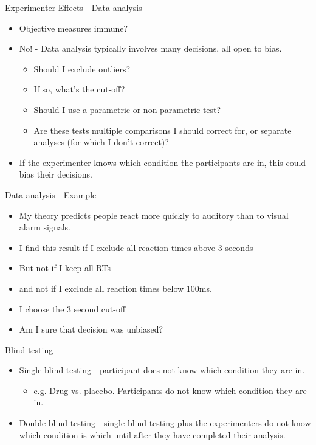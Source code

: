 \documentclass{beamer}
\begin{document}
\begin{frame}{Experimenter Effects - Data analysis  }
\begin{itemize}
\item Objective measures immune? 
\item No! - Data analysis typically involves many decisions, all open to bias. 
\begin{itemize}
\item Should I exclude outliers?
\item If so, what's the cut-off?
\item Should I use a parametric or non-parametric test?
\item Are these tests multiple comparisons I should correct for, or separate analyses (for which I don't correct)?
\end{itemize}
\item If the experimenter knows which condition the participants are in, this could bias their decisions.
\end{itemize}
\end{frame}



\begin{frame}{Data analysis - Example }
\begin{itemize}
\item My theory predicts people react more quickly to auditory than to visual alarm signals.
\item I find this result if I exclude all reaction times above 3 seconds
\item But not if I keep all RTs
\item and not if I exclude all reaction times below 100ms.
\item I choose the 3 second cut-off
\item Am I sure that decision was unbiased?
\end{itemize}
\end{frame}


\begin{frame}{Blind testing}
\begin{itemize}
\item Single-blind testing - participant does not know which condition they are in. 
\begin{itemize}
\item e.g. Drug vs. placebo. Participants do not know which condition they are in. 
\end{itemize}
\item Double-blind testing - single-blind testing plus the experimenters do not know which condition is which until after they have completed their analysis.
\end{itemize}
\end{frame}
\end{document}
